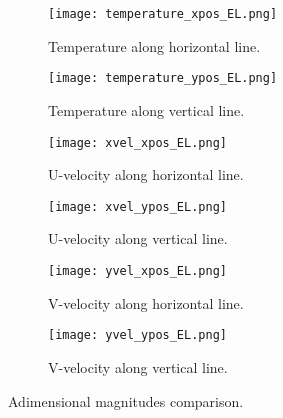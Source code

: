 \clearpage
\begin{figure}[h!]
	\begin{subfigure}{0.50\textwidth}
		\centering
		\texttt{[image: temperature\_xpos\_EL.png]}\hfill
		\caption{Temperature along horizontal line.} \label{3.13figa}
	\end{subfigure}
	\hfill
	\begin{subfigure}{0.50\textwidth}
		\centering
		\texttt{[image: temperature\_ypos\_EL.png]}	
		\caption{Temperature along vertical line.}\label{3.13figb}
	\end{subfigure}
	\begin{subfigure}{0.50\textwidth}
		\texttt{[image: xvel\_xpos\_EL.png]}\hfill
		\caption{U-velocity along horizontal line.}\label{3.13figc}
	\end{subfigure}
	\begin{subfigure}{0.50\textwidth}
		\texttt{[image: xvel\_ypos\_EL.png]}	
		\caption{U-velocity along vertical line.}\label{3.13figd}
	\end{subfigure}
	\begin{subfigure}{0.50\textwidth}
		\texttt{[image: yvel\_xpos\_EL.png]}\hfill	
		\caption{V-velocity along horizontal line.}\label{3.13fige}
	\end{subfigure}
	\begin{subfigure}{0.50\textwidth}
		\texttt{[image: yvel\_ypos\_EL.png]}	
		\caption{V-velocity along vertical line.}\label{3.13figf}
	\end{subfigure}
	\caption{Adimensional magnitudes comparison.}
	\label{3.13fig}
\end{figure}
\clearpage
